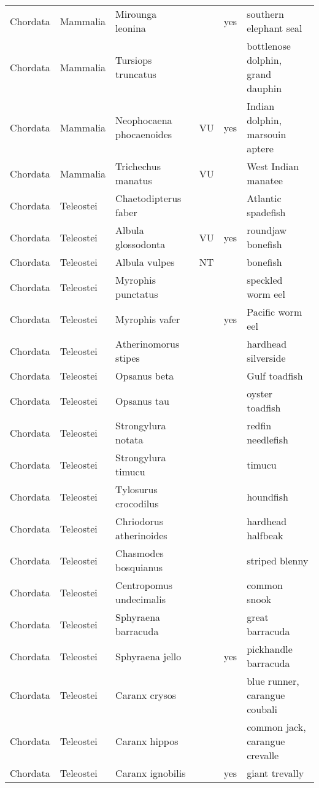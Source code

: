 \begin{longtable}{llllll}
  Chordata & Mammalia & Mirounga leonina &  & yes & southern elephant seal \\ 
  Chordata & Mammalia & Tursiops truncatus &  &  & bottlenose dolphin, grand dauphin \\ 
  Chordata & Mammalia & Neophocaena phocaenoides & VU & yes & Indian dolphin, marsouin aptere \\ 
  Chordata & Mammalia & Trichechus manatus & VU &  & West Indian manatee \\ 
  Chordata & Teleostei & Chaetodipterus faber &  &  & Atlantic spadefish \\ 
  Chordata & Teleostei & Albula glossodonta & VU & yes & roundjaw bonefish \\ 
  Chordata & Teleostei & Albula vulpes & NT &  & bonefish \\ 
  Chordata & Teleostei & Myrophis punctatus &  &  & speckled worm eel \\ 
  Chordata & Teleostei & Myrophis vafer &  & yes & Pacific worm eel \\ 
  Chordata & Teleostei & Atherinomorus stipes &  &  & hardhead silverside \\ 
  Chordata & Teleostei & Opsanus beta &  &  & Gulf toadfish \\ 
  Chordata & Teleostei & Opsanus tau &  &  & oyster toadfish \\ 
  Chordata & Teleostei & Strongylura notata &  &  & redfin needlefish \\ 
  Chordata & Teleostei & Strongylura timucu &  &  & timucu \\ 
  Chordata & Teleostei & Tylosurus crocodilus &  &  & houndfish \\ 
  Chordata & Teleostei & Chriodorus atherinoides &  &  & hardhead halfbeak \\ 
  Chordata & Teleostei & Chasmodes bosquianus &  &  & striped blenny \\ 
  Chordata & Teleostei & Centropomus undecimalis &  &  & common snook \\ 
  Chordata & Teleostei & Sphyraena barracuda &  &  & great barracuda \\ 
  Chordata & Teleostei & Sphyraena jello &  & yes & pickhandle barracuda \\ 
  Chordata & Teleostei & Caranx crysos &  &  & blue runner, carangue coubali \\ 
  Chordata & Teleostei & Caranx hippos &  &  & common jack, carangue crevalle \\ 
  Chordata & Teleostei & Caranx ignobilis &  & yes & giant trevally \\ 

\end{longtable}
